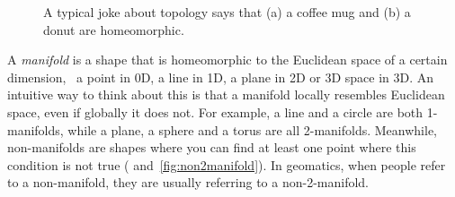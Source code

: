 \begin{figure}
\begin{subfigure}[b]{0.3\linewidth}
\caption{}%
\label{subfig:donut}
\end{subfigure}
\caption{A typical joke about topology says that (a) a coffee mug and (b) a donut are homeomorphic.}%
\label{fig:homeomorphism}
\end{figure}

A \emph{manifold} is a shape that is homeomorphic to the Euclidean space of a certain dimension, \ie\ a point in 0D, a line in 1D, a plane in 2D or 3D space in 3D.
An intuitive way to think about this is that a manifold locally resembles Euclidean space, even if globally it does not.
For example, a line and a circle are both 1-manifolds, while a plane, a sphere and a torus are all 2-manifolds.
Meanwhile, non-manifolds are shapes where you can find at least one point where this condition is not true ( and~\ref{fig:non2manifold}).
In geomatics, when people refer to a non-manifold, they are usually referring to a non-2-manifold.

